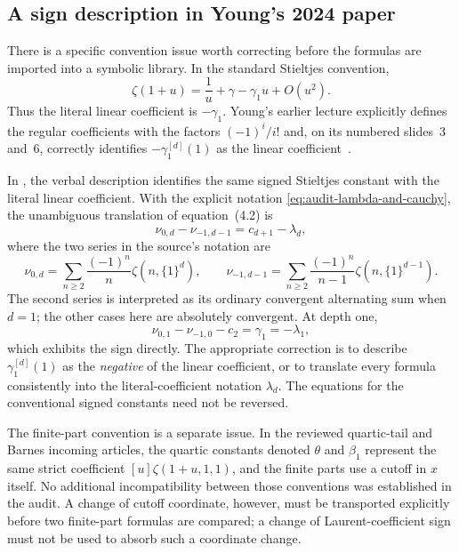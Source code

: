 \documentclass[11pt,a4paper]{article}
\numberwithin{equation}{section}
\theoremstyle{definition}
\begin{document}
\subsection{A sign description in Young's 2024 paper}

There is a specific convention issue worth correcting before the
formulas are imported into a symbolic library.  In the standard
Stieltjes convention,
\begin{equation}
 \zeta(1+u)=\frac1u+\gamma-\gamma_1u+O(u^2).
 \label{eq:audit-standard-stieltjes-sign}
\end{equation}
Thus the literal linear coefficient is $-\gamma_1$.
Young's earlier lecture explicitly defines the regular coefficients
with the factors $(-1)^i/i!$ and, on its numbered slides~3 and~6,
correctly identifies $-\gamma_1^{[d]}(1)$ as the linear
coefficient~\cite{YoungLecture}.

In \cite[equations~(4.1)--(4.2) and Corollary~3]{Young2024},
the verbal description identifies the same signed Stieltjes
constant with the literal linear coefficient.  With the explicit
notation \eqref{eq:audit-lambda-and-cauchy}, the unambiguous
translation of equation~(4.2) is
\begin{equation}
 \nu_{0,d}-\nu_{-1,d-1}=c_{d+1}-\lambda_d,
 \label{eq:audit-young-sign-translation}
\end{equation}
where the two series in the source's notation are
\begin{equation}
 \nu_{0,d}=\sum_{n\geq2}\frac{(-1)^n}{n}
                       \zeta(n,\{1\}^{d}),\qquad
 \nu_{-1,d-1}=\sum_{n\geq2}\frac{(-1)^n}{n-1}
                       \zeta(n,\{1\}^{d-1}).
 \label{eq:audit-young-nu-definition}
\end{equation}
The second series is interpreted as its ordinary convergent
alternating sum when $d=1$; the other cases here are absolutely
convergent.  At depth one,
\begin{equation}
 \nu_{0,1}-\nu_{-1,0}-c_2=\gamma_1=-\lambda_1,
 \label{eq:audit-depth-one-sign-control}
\end{equation}
which exhibits the sign directly.  The appropriate correction is
to describe $\gamma_1^{[d]}(1)$ as the \emph{negative} of the
linear coefficient, or to translate every formula consistently
into the literal-coefficient notation $\lambda_d$.  The equations
for the conventional signed constants need not be reversed.

The finite-part convention is a separate issue.  In the reviewed
quartic-tail and Barnes incoming articles, the quartic constants
denoted $\theta$ and $\beta_1$ represent the same strict coefficient
$[u]\zeta(1+u,1,1)$, and the finite parts use a cutoff in $x$
itself.  No additional incompatibility between those conventions
was established in the audit.  A change of cutoff coordinate,
however, must be transported explicitly before two finite-part
formulas are compared; a change of Laurent-coefficient sign must
not be used to absorb such a coordinate change.
\end{document}
